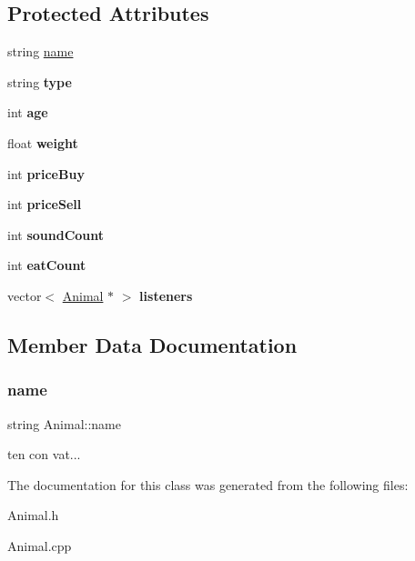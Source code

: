 \subsection*{Protected Attributes}
\begin{DoxyCompactItemize}
\item 
string \hyperlink{class_animal_a9cf3bfd9070daec7b3bbc87cbd958f35}{name}
\item 
\mbox{\label{class_animal_a8b120b31083a0561ab9969d5aeb03195}} 
string {\bfseries type}
\item 
\mbox{\label{class_animal_a31e4a23bef9596927496de4eb6b9c721}} 
int {\bfseries age}
\item 
\mbox{\label{class_animal_a055c4df7dacb89eb4c2ca9bbee11ff24}} 
float {\bfseries weight}
\item 
\mbox{\label{class_animal_ae18bdb6ca2de33354df5d877f159fb5b}} 
int {\bfseries price\+Buy}
\item 
\mbox{\label{class_animal_a5386cd93699ab24f8faddc3a2bfeea99}} 
int {\bfseries price\+Sell}
\item 
\mbox{\label{class_animal_a386cf61e5b26f85531a56cdefbae3784}} 
int {\bfseries sound\+Count}
\item 
\mbox{\label{class_animal_a4819eec8f0cb2e20cd40328db1d313d8}} 
int {\bfseries eat\+Count}
\item 
\mbox{\label{class_animal_a15e2ae06f4ce89a2c1a20fa3f919586c}} 
vector$<$ \hyperlink{class_animal}{Animal} $\ast$ $>$ {\bfseries listeners}
\end{DoxyCompactItemize}


\subsection{Member Data Documentation}
\mbox{\label{class_animal_a9cf3bfd9070daec7b3bbc87cbd958f35}} 
\subsubsection{\texorpdfstring{name}{name}}
{\footnotesize\ttfamily string Animal\+::name\hspace{0.3cm}{\ttfamily [protected]}}

ten con vat... 

The documentation for this class was generated from the following files\+:\begin{DoxyCompactItemize}
\item 
Animal.\+h\item 
Animal.\+cpp\end{DoxyCompactItemize}

